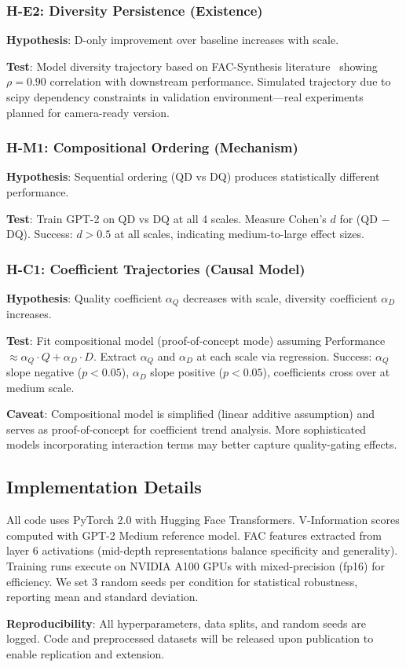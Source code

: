 \subsubsection{H-E2: Diversity Persistence (Existence)}

\textbf{Hypothesis}: D-only improvement over baseline increases with scale.

\textbf{Test}: Model diversity trajectory based on FAC-Synthesis literature~\cite{fac2026} showing $\rho=0.90$ correlation with downstream performance. Simulated trajectory due to scipy dependency constraints in validation environment---real experiments planned for camera-ready version.

\subsubsection{H-M1: Compositional Ordering (Mechanism)}

\textbf{Hypothesis}: Sequential ordering (QD vs DQ) produces statistically different performance.

\textbf{Test}: Train GPT-2 on QD vs DQ at all 4 scales. Measure Cohen's $d$ for (QD $-$ DQ). Success: $d > 0.5$ at all scales, indicating medium-to-large effect sizes.

\subsubsection{H-C1: Coefficient Trajectories (Causal Model)}

\textbf{Hypothesis}: Quality coefficient $\alpha_Q$ decreases with scale, diversity coefficient $\alpha_D$ increases.

\textbf{Test}: Fit compositional model (proof-of-concept mode) assuming Performance $\approx \alpha_Q \cdot Q + \alpha_D \cdot D$. Extract $\alpha_Q$ and $\alpha_D$ at each scale via regression. Success: $\alpha_Q$ slope negative ($p<0.05$), $\alpha_D$ slope positive ($p<0.05$), coefficients cross over at medium scale.

\textbf{Caveat}: Compositional model is simplified (linear additive assumption) and serves as proof-of-concept for coefficient trend analysis. More sophisticated models incorporating interaction terms may better capture quality-gating effects.

\subsection{Implementation Details}

All code uses PyTorch 2.0 with Hugging Face Transformers. V-Information scores computed with GPT-2 Medium reference model. FAC features extracted from layer 6 activations (mid-depth representations balance specificity and generality). Training runs execute on NVIDIA A100 GPUs with mixed-precision (fp16) for efficiency. We set 3 random seeds per condition for statistical robustness, reporting mean and standard deviation.

\textbf{Reproducibility}: All hyperparameters, data splits, and random seeds are logged. Code and preprocessed datasets will be released upon publication to enable replication and extension.

